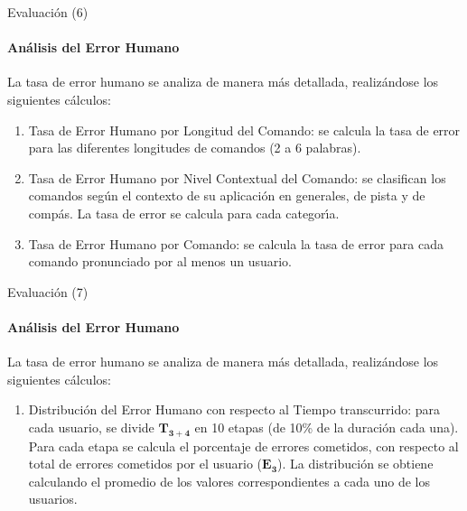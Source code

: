 \begin{frame}{Evaluaci\'on (6)}
\framesubtitle{An\'alisis del Error Humano}
La tasa de error humano se analiza de manera m\'as detallada, realiz\'andose los siguientes c\'alculos:
\begin{enumerate}
    \item Tasa de Error Humano por Longitud del Comando: se calcula la tasa de error para las
    diferentes longitudes de comandos (2 a 6 palabras).
    \item Tasa de Error Humano por Nivel Contextual del Comando: se clasifican los comandos
    seg\'un el contexto de su aplicaci\'on en generales, de pista y de comp\'as. La tasa de error
    se calcula para cada categor{\'\i}a.
    \item Tasa de Error Humano por Comando: se calcula la tasa de error para cada comando pronunciado
    por al menos un usuario.
\end{enumerate} 
\end{frame}

\begin{frame}{Evaluaci\'on (7)}
\framesubtitle{An\'alisis del Error Humano}
La tasa de error humano se analiza de manera m\'as detallada, realiz\'andose los siguientes c\'alculos:
\begin{enumerate}
    \item Distribuci\'on del Error Humano con respecto al Tiempo transcurrido: para cada usuario, 
    se divide $\boldsymbol{T_{3+4}}$ en 10 etapas (de 10\% de la duraci\'on cada una).
    Para cada etapa se calcula el porcentaje de errores cometidos, con respecto al total de
    errores cometidos por el usuario ($\boldsymbol{E_3}$). 
    La distribuci\'on se obtiene calculando el promedio de los valores correspondientes a 
    cada uno de los usuarios.
\end{enumerate} 
\end{frame}

